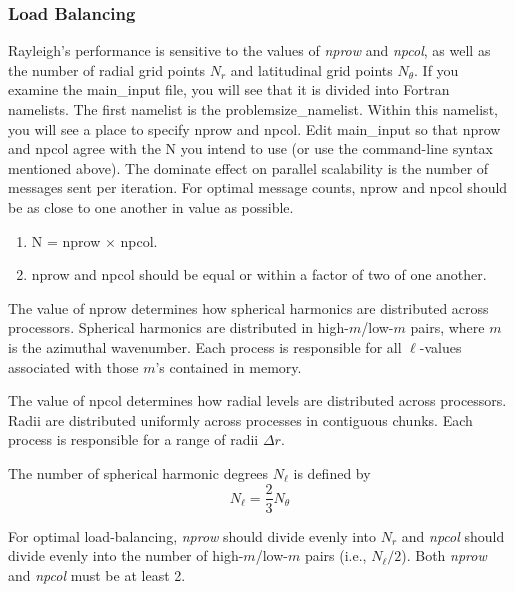 \subsubsection{Load Balancing}
Rayleigh's performance is sensitive to the values of \textit{nprow} and \textit{npcol}, as well as the number of radial grid points $N_r$ and latitudinal grid points $N_\theta$.   If you examine the main\_input file,  you will see that it is divided into Fortran namelists.  The first namelist is the problemsize\_namelist.  Within this namelist, you will see a place to specify nprow and npcol.  Edit main\_input so that nprow and npcol agree with the N you intend to use (or use the command-line syntax mentioned above).  The dominate effect on parallel scalability is the number of messages sent per iteration.  For optimal message counts, nprow and npcol should be as close to one another in value as possible.  

\begin{enumerate}
\item N = nprow $\times$ npcol.                                           
\item nprow and npcol should be equal or within a factor of two of one another.                   
\end{enumerate}

The value of nprow determines how spherical harmonics are distributed across processors.   Spherical harmonics are distributed in high-$m$/low-$m$ pairs, where $m$ is the azimuthal wavenumber.  Each process is responsible for all $\ell$-values associated with those $m$'s contained in memory.

The value of npcol determines how radial levels are distributed across processors.  Radii are distributed uniformly across processes in contiguous chunks.  Each process is responsible for a range of radii $\Delta r$.

The number of spherical harmonic degrees $N_\ell$ is defined by
\begin{equation}
N_\ell = \frac{2}{3}N_\theta
\end{equation}

For optimal load-balancing, \textit{nprow} should divide evenly into $N_r$ and \textit{npcol} should divide evenly into the number of high-$m$/low-$m$ pairs (i.e., $N_\ell/2$).  Both \textit{nprow} and \textit{npcol} must be at least 2.

